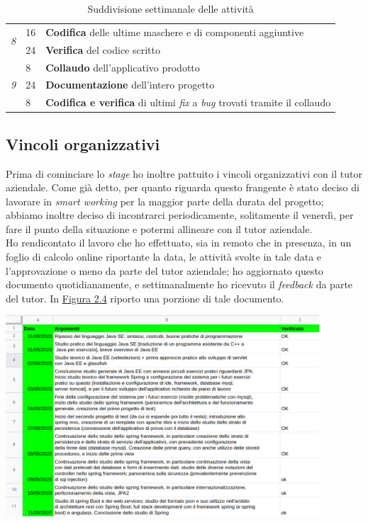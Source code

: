 \begin{table}[h]
\begin{tabularx}{\textwidth}{|l|l|X|}
  \multirow{2}{*}{\textit{8}} & 16           & \textbf{Codifica} delle ultime maschere e di componenti aggiuntive           \\ \cline{2-3}
                              & 24           & \textbf{Verifica} del codice scritto                  \\ \hline
  \multirow{3}{*}{\textit{9}} & 8            & \textbf{Collaudo} dell'applicativo prodotto                  \\ \cline{2-3}
                              & 24           & \textbf{Documentazione} dell'intero progetto            \\ \cline{2-3}
                              & 8            & \textbf{Codifica e verifica} di ultimi \textit{fix} a \textit{bug} trovati tramite il collaudo                \\ \hline
  \end{tabularx}
  \caption{Suddivisione settimanale delle attività}
\end{table}

\subsection{Vincoli organizzativi}

Prima di cominciare lo \textit{stage} ho inoltre pattuito i vincoli organizzativi con il tutor aziendale. Come già detto, per quanto riguarda questo frangente è stato deciso di lavorare in \textit{smart working} per la maggior parte della durata del progetto; abbiamo inoltre deciso di incontrarci periodicamente, solitamente il venerdì, per fare il punto della situazione e potermi allineare con il tutor aziendale. \\
Ho rendicontato il lavoro che ho effettuato, sia in remoto che in presenza, in un foglio di calcolo online riportante la data, le attività svolte in tale data e l'approvazione o meno da parte del tutor aziendale; ho aggiornato questo documento quotidianamente, e settimanalmente ho ricevuto il \textit{feedback} da parte del tutor. In \hyperref[img:drive]{Figura 2.4} riporto una porzione di tale documento. \newpage

\begin{minipage}{\linewidth}
  \label{img:drive}
  \centering
    \includegraphics[height=7.5cm]{immagini/drive}
\end{minipage} \\

